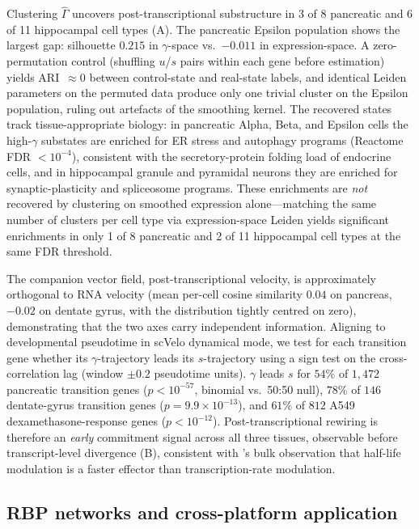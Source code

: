 \documentclass{article}
\begin{document}
Clustering $\widehat\Gamma$ uncovers post-transcriptional substructure in
3 of 8 pancreatic and 6 of 11 hippocampal cell types
(A). The pancreatic Epsilon population shows the largest
gap: silhouette $0.215$ in $\gamma$-space vs.\ $-0.011$ in expression-space.
A zero-permutation control (shuffling $u$/$s$ pairs within each gene before
estimation) yields ARI~$\approx 0$ between control-state and real-state
labels, and identical Leiden parameters on the permuted data produce only
one trivial cluster on the Epsilon population, ruling out artefacts of the
smoothing kernel. The recovered states track tissue-appropriate biology:
in pancreatic Alpha, Beta, and Epsilon cells the high-$\gamma$ substates
are enriched for ER stress and autophagy programs (Reactome
FDR $<10^{-4}$), consistent with the secretory-protein folding load of
endocrine cells, and in hippocampal granule and pyramidal neurons they
are enriched for synaptic-plasticity and spliceosome programs. These
enrichments are \emph{not} recovered by clustering on smoothed expression
alone---matching the same number of clusters per cell type via
expression-space Leiden yields significant enrichments in only 1 of 8
pancreatic and 2 of 11 hippocampal cell types at the same FDR threshold.

The companion vector field, post-transcriptional velocity, is
approximately orthogonal to RNA velocity (mean per-cell cosine similarity
$0.04$ on pancreas, $-0.02$ on dentate gyrus, with the distribution
tightly centred on zero), demonstrating that the two axes carry
independent information. Aligning to developmental pseudotime in scVelo
dynamical mode, we test for each transition gene whether its
$\gamma$-trajectory leads its $s$-trajectory using a sign test on the
cross-correlation lag (window $\pm 0.2$ pseudotime units). $\gamma$ leads
$s$ for $54\%$ of $1{,}472$ pancreatic transition genes
($p{<}10^{-57}$, binomial vs.\ 50:50 null), $78\%$ of $146$ dentate-gyrus
transition genes ($p{=}9.9{\times}10^{-13}$), and $61\%$ of $812$ A549
dexamethasone-response genes ($p{<}10^{-12}$). Post-transcriptional
rewiring is therefore an \emph{early} commitment signal across all three
tissues, observable before transcript-level divergence
(B), consistent with \citet{eisen2020}'s bulk
observation that half-life modulation is a faster effector than
transcription-rate modulation.

\subsection{RBP networks and cross-platform application}
\label{sec:results-network}
\end{document}
